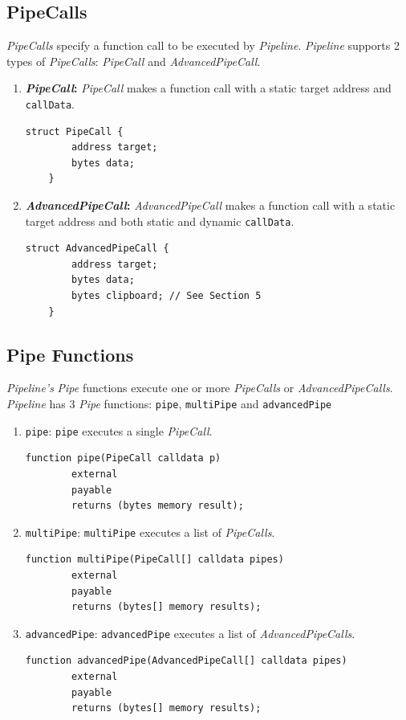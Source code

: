 \documentclass[tikz]{article}
\newcommand{\code}[1]{\texttt{#1}}
\newcommand{\term}[1]{\textsl{#1}}
\begin{document}
\newpage
\subsection{PipeCalls}
\term{PipeCalls} specify a function call to be executed by \term{Pipeline}. \term{Pipeline} supports 2 types of \term{PipeCalls}: \term{PipeCall} and \term{AdvancedPipeCall}.

\begin{enumerate}
    \item \textbf{\term{PipeCall}:} \term{PipeCall} makes a function call with a static target address and \code{callData}.
    \begin{lstlisting}[language=Solidity]
    struct PipeCall {
        address target;
        bytes data;
    }
    \end{lstlisting}

    \item \textbf{\term{AdvancedPipeCall}:} \term{AdvancedPipeCall} makes a function call with a static target address and both static and dynamic \code{callData}.
    \begin{lstlisting}[language=Solidity]
    struct AdvancedPipeCall {
        address target;
        bytes data;
        bytes clipboard; // See Section 5
    }
    \end{lstlisting}

\end{enumerate}

\subsection{Pipe Functions}
\term{Pipeline's} \term{Pipe} functions execute one or more \term{PipeCalls} or \term{AdvancedPipeCalls}. \term{Pipeline} has 3 \term{Pipe} functions: \code{pipe}, \code{multiPipe} and \code{advancedPipe}

\begin{enumerate}
    \item \code{pipe}: \code{pipe} executes a single \term{PipeCall}.
    \begin{lstlisting}[language=Solidity]
    function pipe(PipeCall calldata p)
        external
        payable
        returns (bytes memory result);
    \end{lstlisting}
    \item \code{multiPipe}: \code{multiPipe} executes a list of \term{PipeCalls}.
    \begin{lstlisting}[language=Solidity]
    function multiPipe(PipeCall[] calldata pipes)
        external
        payable
        returns (bytes[] memory results);
    \end{lstlisting}
    \item \code{advancedPipe}: \code{advancedPipe} executes a list of \term{AdvancedPipeCalls}.
    \begin{lstlisting}[language=Solidity]
    function advancedPipe(AdvancedPipeCall[] calldata pipes)
        external
        payable
        returns (bytes[] memory results);
    \end{lstlisting}
\end{enumerate}
\end{document}
